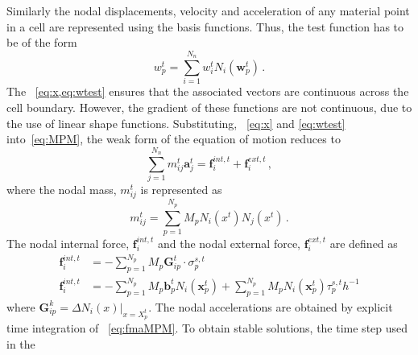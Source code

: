 %
Similarly the nodal displacements, velocity and acceleration of any material 
point in a cell are represented using the basis functions. Thus, the test 
function has to be of the form
%
\begin{equation}
\mathbf{\mathit{w}}_{p}^{t} = \sum\limits_{\mathit{i}=1}^{\mathit{N}_{n}} 
\mathbf{\mathit{w}}_{\mathit{i}}^{t}\mathit{N}_{\mathit{i}}(\mathbf{w}_{p}^{t}) 
\,.
\label{eq:wtest}
\end{equation}
%
The ~\cref{eq:x,eq:wtest} ensures that the associated vectors are 
continuous across the cell boundary. However, the gradient of these functions 
are not continuous, due to the use of linear shape functions. Substituting, 
~\cref{eq:x} and \cref{eq:wtest} into~\cref{eq:MPM}, the weak form of the 
equation of motion reduces to
%
\begin{equation}
\sum\limits_{\mathit{j}=1}^{\mathit{N}_{n}} m_{\mathit{ij}}^{\mathit{t}} 
\mathbf{a}_{\mathit{j}}^{\mathit{t}} = \mathbf{f}_{\mathit{i}}^{int,\mathit{t}} 
+ \mathbf{f}_{\mathit{i}}^{ext,\mathit{t}} \,,
\label{eq:fmaMPM}
\end{equation}
%
where the nodal mass, $m_{\mathit{ij}}^{\mathit{t}}$ is represented as
%
\begin{equation}
m_{\mathit{ij}}^{\mathit{t}} = \sum\limits_{\mathit{p=1}}^{N_{p}} 
\mathit{M}_{p} \mathit{N}_{\mathit{i}} (\mathbf{\mathit{x}}^{\mathit{t}}) 
\mathit{N}_{\mathit{j}} (\mathbf{\mathit{x}}^{\mathit{t}}) \,.
\end{equation}
%
The nodal internal force, $\mathbf{f}_{\mathit{i}}^{int,\mathit{t}}$ and the 
nodal external force, $\mathbf{f}_{\mathit{i}}^{ext,\mathit{t}}$ are defined as
%
\begin{align}
\nonumber
 \mathbf{f}_{\mathit{i}}^{int,\mathit{t}} & = - 
\sum\limits_{\mathit{p}=1}^{\mathit{N}_{p}}\mathit{M}_{p} \mathbf{G}_{ip}^{t} 
\cdot \sigma_{p}^{\mathit{s,t}} \\ 
\mathbf{f}_{\mathit{i}}^{int,\mathit{t}} & = - 
\sum\limits_{\mathit{p}=1}^{\mathit{N}_{p}}\mathit{M}_{p}  
\mathbf{b}_{p}^{\mathit{t}}\mathit{N}_{\mathit{i}}(\mathbf{x}_{p}^{\mathit{t}}) 
+ \sum\limits_{\mathit{p}=1}^{\mathit{N}_{p}}\mathit{M}_{p} 
\mathit{N}_{\mathit{i}}(\mathbf{x}_{p}^{\mathit{t}}) 
\tau_{p}^{\mathit{s,t}}\mathit{h}^{-1}
\end{align}
where $\mathbf{G}_{\mathit{ip}}^{\mathit{k}} = \Delta \mathit{N}_{\mathit{i}} 
(\mathbf{\mathit{x}})|_{\mathbf{\mathit{x}}=\mathbf{\mathit{X}}_{p}^{\mathit{t}}}$.
The nodal accelerations are obtained by explicit time integration of 
~\cref{eq:fmaMPM}. To obtain stable solutions, the time step used in the 
